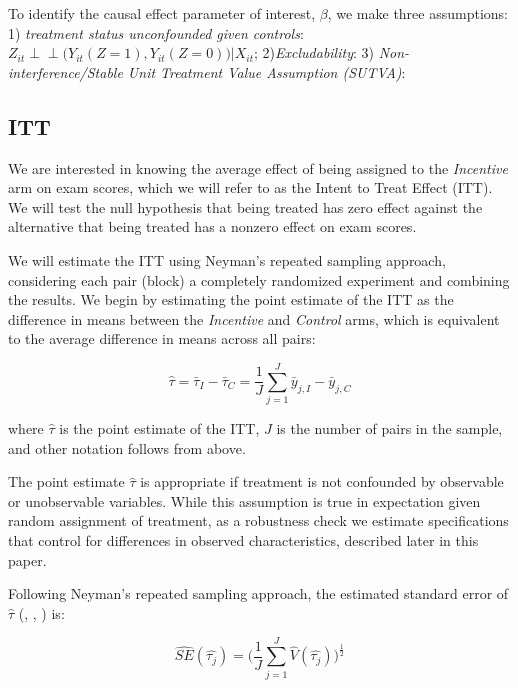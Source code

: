 \documentclass[12pt]{article}
\begin{document}
To identify the causal effect parameter of interest, $\beta$, we make three assumptions: 1) \textit{treatment status unconfounded given controls}: $Z_{it} \perp \!\!\! \perp \Big(Y_{it}(Z=1), Y_{it}(Z=0)\Big) \Big| X_{it}$; 2)\textit{Excludability}: 3) \textit{Non-interference/Stable Unit Treatment Value Assumption (SUTVA)}: 



\subsection{ITT}

We are interested in knowing the average effect of being assigned to the \textit{Incentive} arm on exam scores, which we will refer to as the Intent to Treat Effect (ITT). We will test the null hypothesis that being treated has zero effect against the alternative that being treated has a nonzero effect on exam scores. %

We will estimate the ITT using Neyman's \citeyear{neyman1935} repeated sampling approach, considering each pair (block) a completely randomized experiment and combining the results. We begin by estimating the point estimate of the ITT as the difference in means between the \textit{Incentive} and \textit{Control} arms, which is equivalent to the average difference in means across all pairs:

\begin{equation} \label{itt_spec}
	\hat{\tau} = \bar{\tau}_I - \bar{\tau}_C = \frac{1}{J}\sum_{j=1}^{J} \bar{y}_{j,I} - \bar{y}_{j,C}
\end{equation}

where $\hat{\tau}$ is the point estimate of the ITT, $J$ is the number of pairs in the sample, and other notation follows from above.

The point estimate $\hat{\tau}$ is appropriate if treatment is not confounded by observable or unobservable variables. While this assumption is true in expectation given random assignment of treatment, as a robustness check we estimate specifications that control for differences in observed characteristics, described later in this paper.

Following Neyman's repeated sampling approach, the estimated standard error of $\hat{\tau}$ (\cite{imai2008}, \cite{ai2015}, \cite{ai2017}) is:

\begin{equation} \label{se_block}
	\hat{SE}(\hat{\tau_j}) = \Big(\frac{1}{J}\sum_{j=1}^{J} \hat{V}(\hat{\tau_j}) \Big)^\frac{1}{2}
\end{equation}
\end{document}
